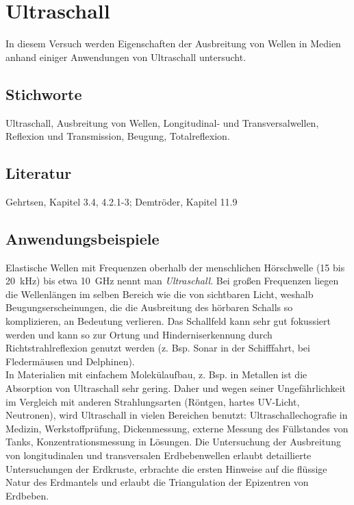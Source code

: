 \chapter{Ultraschall}
\label{vn:2}

In diesem Versuch werden Eigenschaften der Ausbreitung von Wellen in Medien anhand einiger Anwendungen von Ultraschall untersucht.
%
\section{Stichworte}
Ultraschall, Ausbreitung von Wellen, Longitudinal- und Transversalwellen, Reflexion und Transmission, Beugung, Totalreflexion.
%
\section{Literatur}
Gehrtsen, Kapitel 3.4, 4.2.1-3; Demtröder, Kapitel 11.9
%
\section{Anwendungsbeispiele}
%
Elastische Wellen mit Frequenzen oberhalb der menschlichen Hörschwelle (15 bis 20~kHz) bis etwa 10~GHz nennt man \textit{Ultraschall}. Bei großen Frequenzen liegen die Wellenlängen im selben Bereich wie die von sichtbaren Licht, weshalb Beugungserscheinungen, die die Ausbreitung des hörbaren Schalls so komplizieren, an Bedeutung verlieren. Das Schallfeld kann sehr gut fokussiert werden und kann so zur Ortung und Hinderniserkennung durch Richtstrahlreflexion genutzt werden (z. Bsp. Sonar in der Schifffahrt, bei Fledermäusen und Delphinen). \\
In Materialien mit einfachem Molekülaufbau, z. Bsp. in Metallen ist die Absorption von Ultraschall sehr gering. Daher und wegen seiner Ungefährlichkeit im Vergleich mit anderen Strahlungsarten (Röntgen, hartes UV-Licht, Neutronen), wird Ultraschall in vielen Bereichen benutzt: Ultraschallechografie in Medizin, Werkstoffprüfung, Dickenmessung, externe Messung des Füllstandes von Tanks, Konzentrationsmessung in Lösungen. Die Untersuchung der Ausbreitung von longitudinalen und transversalen Erdbebenwellen erlaubt detaillierte Untersuchungen der Erdkruste, erbrachte die ersten Hinweise auf die flüssige Natur des Erdmantels und erlaubt die Triangulation der Epizentren von Erdbeben.
%
